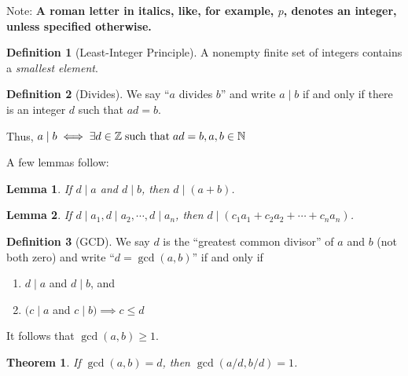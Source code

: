 \documentclass[english,notitlepage,smartquotes]{hgbreport}
\theoremstyle{definition}
\newtheorem*{definition}{Definition}
\theoremstyle{remark}
\theoremstyle{plain}
\newtheorem{theorem}{Theorem}[chapter]
\newtheorem{lemma}{Lemma}[chapter]
\begin{document}
Note: \textbf{A roman letter in italics, like, for example, $p$, denotes an integer, unless specified otherwise.}
\begin{definition}[Least-Integer Principle]
A nonempty finite set of integers contains a \emph{smallest element}.
\end{definition}
\begin{definition}[Divides]
\label{def:divides}
We say ``$a$ divides $b$'' and write $a\mid b$ if and only if there is an integer $d$ such that $ad=b$.

Thus, $a\mid b \iff \exists d\in \mathbb{Z} \text{\;such that\;} ad=b,  a, b\in \mathbb{N}$
\end{definition}

A few lemmas follow:
\begin{lemma}
\label{lemma:divides-sum}
If $d\mid a$ and $d\mid b$, then $d\mid(a+b)$.
\end{lemma}
\begin{lemma}
\label{lemma:divides-lin-comb}
If $d\mid a_1,d\mid a_2,\cdots, d\mid a_n$, then $d\mid(c_1a_1+c_2a_2+\cdots+c_na_n)$.
\end{lemma}
\begin{definition}[GCD]
\label{def:gcd}
We say $d$ is the ``greatest common divisor'' of $a$ and $b$ (not both zero) and write ``$d=\gcd(a, b)$'' if and only if
\begin{enumerate}
\item $d\mid a$ and $d\mid b$, and
\item $(c\mid a$ and $c\mid b)\implies c\leq d$
\end{enumerate}
\end{definition}

It follows that $\gcd(a, b)\geq 1$.

\begin{theorem}
\label{thm:gcd-multiple}
If $\gcd(a,b)=d$, then $\gcd(a/d, b/d)=1$.
\end{theorem}
\end{document}
